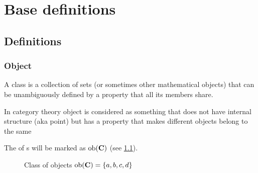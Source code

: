 \chapter{Base definitions}

\section{Definitions}

\subsection{Object}

\begin{definition}[Class]
  A class is a collection of sets (or sometimes other mathematical
  objects) that can be unambiguously defined by a property that all
  its members share. 
  \label{def:class}
\end{definition}

\begin{definition}[Object]
  \label{def:object}
  In category theory object is considered as something that does not
  have internal structure (aka point) but has a property that makes
  different objects belong to the same 
\end{definition}

\begin{remark}
  \label{rem:objclass}
  The  of s will be marked as 
  $\mathrm{ob}(\mathbf{C})$ (see \cref{fig:class_of_objects}).
\end{remark}

\begin{figure}
  \centering
  \caption{Class of objects $\mathrm{ob}(\mathbf{C})=\{a,b,c,d\}$}
  \label{fig:class_of_objects}
\end{figure}


